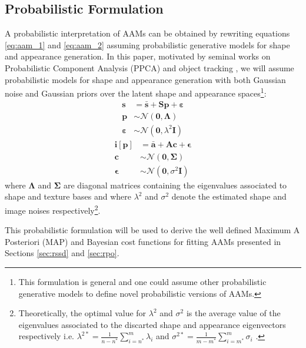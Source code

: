 \subsection{Probabilistic Formulation}
\label{sec:probabilistic_aam}

A probabilistic interpretation of AAMs can be obtained by rewriting equations \ref{eq:aam_1} and \ref{eq:aam_2} assuming probabilistic generative models for shape and appearance generation. In this paper, motivated by seminal works on Probabilistic Component Analysis (PPCA) and object tracking \cite{Tipping1999, Roweis1998, Moghaddam1997}, we will assume probabilistic models for shape and appearance generation with both Gaussian noise and Gaussian priors over the latent shape and appearance spaces\footnote{This formulation is general and one could assume other probabilistic generative models \cite{vanderMaaten2010, Bach2005, Prince2012, Nicolau2014} to define novel probabilistic versions of AAMs.}:
\begin{equation}
	\begin{aligned}
		\mathbf{s} & = \bar{\mathbf{s}} + \mathbf{S} \mathbf{p} + \boldsymbol{\varepsilon}
		\\
		\mathbf{p} & \sim \mathcal{N} \left( \mathbf{0}, \mathbf{\Lambda} \right) 
		\\
		\boldsymbol{\varepsilon} & \sim \mathcal{N} \left( \mathbf{0}, \lambda^2 \mathbf{I} \right) 
	\end{aligned}
\end{equation}
\begin{equation}
	\begin{aligned}
		\mathbf{i}[\mathbf{p}] & = \bar{\mathbf{a}} + \mathbf{A} \mathbf{c} + \boldsymbol{\epsilon}
		\\
		\mathbf{c} & \sim \mathcal{N} \left( \mathbf{0}, \mathbf{\Sigma} \right) 
		\\
		\boldsymbol{\epsilon} & \sim \mathcal{N} \left( \mathbf{0}, \sigma^2 \mathbf{I} \right) 
	\end{aligned}
\end{equation}
where $\mathbf{\Lambda}$ and $\mathbf{\Sigma}$ are diagonal matrices containing the eigenvalues associated to shape and texture bases and where $\lambda^2$ and $\sigma^2$ denote the estimated shape and image noises respectively\footnote{\label{foot:noise}Theoretically, the optimal value for $\lambda^2$ and $\sigma^2$ is the average value of the eigenvalues associated to the discarted shape and appearance eigenvectors respectively i.e. \mbox{$\lambda^{2*} = \frac{1}{n-n^*}\sum_{i=n^*}^m \lambda_{i}$} and \mbox{$\sigma^{2*} = \frac{1}{m-m^*}\sum_{i=m^*}^m \sigma_{i}$} \cite{Moghaddam1997}.}.

This probabilistic formulation will be used to derive the well defined Maximum A Posteriori (MAP) and Bayesian cost functions for fitting AAMs presented in Sections \ref{sec:rssd} and \ref{sec:rpo}.

